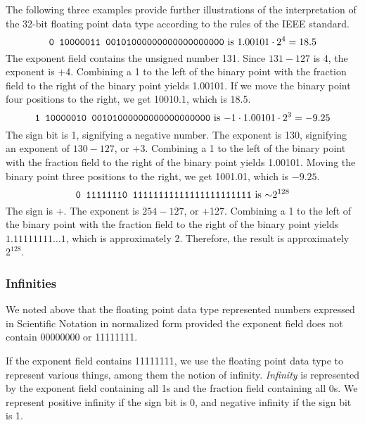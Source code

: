 \documentclass{patt}
\begin{document}
\begin{example}
The following three examples provide further illustrations of the
interpretation of the 32-bit floating point data type
according to the rules of the IEEE standard.
\begin{equation*}
\text{\texttt{0 10000011 00101000000000000000000} is }1.00101\cdot 2^4=18.5
\end{equation*}
The exponent field contains the unsigned number 131.
Since $131 - 127$ is 4, the exponent is $+$4.
Combining a 1 to the left of the binary point with the
fraction field to the right of the binary point yields
1.00101.  If we move the binary point four positions to
the right, we get 10010.1, which is 18.5.
\begin{equation*}
\text{\texttt{1 10000010 00101000000000000000000} is } {-}1 \cdot 1.00101
\cdot 2^3 = -9.25
\end{equation*}
The sign bit is 1, signifying a negative number.
The exponent is 130, signifying an exponent of $130 - 127$,
or $+$3.  Combining a 1 to the left of the binary point with
the fraction field to the right of the binary point
yields 1.00101.  Moving the binary point three positions to
the right, we get 1001.01, which is $-9.25$.
\begin{equation*}
\text{\texttt{0 11111110 11111111111111111111111} is }{\sim}2^{128}
\end{equation*}
The sign is $+$.  The exponent is $254 -127$, or $+$127.
Combining a 1 to the left of the binary point with the fraction
field to the right of the binary point yields
$1.11111111\ldots1$, which is approximately 2.
Therefore, the result is approximately $2^{128}$.
\end{example}

\subsubsection{Infinities}\label{sec:infinity}

We noted above that the floating point data type represented numbers expressed
in Scientific Notation in normalized form provided the exponent field does
not contain 00000000 or 11111111.

If the exponent field contains 11111111, we use the floating point data type
to represent various things, among them the notion of infinity.  {\em Infinity}
is represented by the exponent field containing all 1s and the fraction field 
containing all 0s.  We represent positive infinity if the sign bit is 0, and 
negative infinity if the sign bit is 1.
\end{document}
